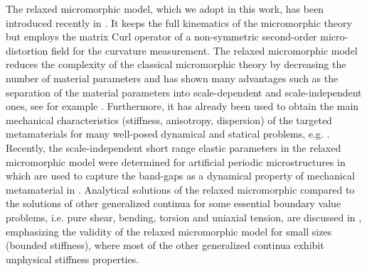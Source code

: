 The relaxed micromorphic model, which we adopt in this work, has been introduced recently in \cite{NefGhiMadPlaRos:2014:aup,GhiNefMadPlaRos:2015:trl,NefGhiLazMad:2015:trl}. It keeps the full kinematics of the  micromorphic theory but employs the matrix Curl operator of a non-symmetric second-order micro-distortion field for the curvature measurement.  The relaxed micromorphic model reduces the complexity of the classical micromorphic theory by decreasing the number of material parameters and has shown many advantages such as the separation of the material parameters into scale-dependent and scale-independent ones, see for example \cite{DagBarGhiEidNefMad:2020:edo}.  Furthermore, it has already been used to obtain the main mechanical characteristics (stiffness, anisotropy, dispersion) of the targeted metamaterials for many well-posed dynamical and statical problems, e.g. \cite{MadNefGhiPlaRos:2015:bgi,MadNefGhiPlaRos:2015:wpi,MadNefGhiRos:2016:rat,MadNefBar:2016:cbg,NefMadBarDagAbrGhi:2017:rwp,BarMadDagAbrGhiNef:2017:taf,MadNefBarGhi:2017:aro,MadColMinBilOuiNef:2018:mpc,BarTalDagAivNefMad:2019:rmm,AivTalAgoDaoNefMad:2020:fan}. Recently, the scale-independent short range elastic parameters in the relaxed micromorphic model were determined for artificial periodic microstructures in \cite{NefEidMad:2019:ios} which are used to capture the band-gaps as  a dynamical property of  mechanical metamaterial in \cite{DagBarGhiEidNefMad:2020:edo}.  Analytical solutions of the relaxed micromorphic compared to the solutions of other generalized continua for some essential boundary value problems, i.e. pure shear, bending, torsion and uniaxial tension, are discussed in \cite{RizHueKhaGhiMadNef:2021:aso1,RizKhaGhiMadNef:2021:aso2,RizHueMadNef:2021:aso3,RizHueMadNef:2021:aso4}, emphasizing the validity of the relaxed micromorphic model for small sizes  (bounded stiffness), where most of the other generalized continua exhibit unphysical stiffness properties. 

